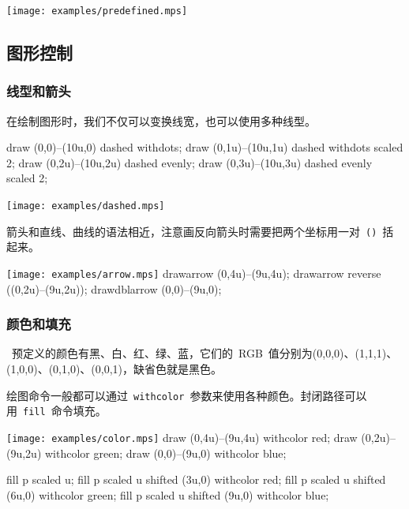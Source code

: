 \begin{out}
\texttt{[image: examples/predefined.mps]}
\end{out}

\subsection{图形控制}

\subsubsection{线型和箭头}
在绘制图形时，我们不仅可以变换线宽，也可以使用多种线型。
\begin{code}
draw (0,0)--(10u,0) dashed withdots;
draw (0,1u)--(10u,1u) dashed withdots scaled 2;
draw (0,2u)--(10u,2u) dashed evenly;
draw (0,3u)--(10u,3u) dashed evenly scaled 2;
\end{code}

\begin{out}
\texttt{[image: examples/dashed.mps]}
\end{out}

箭头和直线、曲线的语法相近，注意画反向箭头时需要把两个坐标用一对~\verb|()|~括起来。

\begin{fdemo}{\texttt{[image: examples/arrow.mps]}}
drawarrow (0,4u)--(9u,4u);
drawarrow reverse ((0,2u)--(9u,2u));
drawdblarrow (0,0)--(9u,0);
\end{fdemo}

\subsubsection{颜色和填充}
\MP~预定义的颜色有黑、白、红、绿、蓝，它们的~RGB~值分别为(0,0,0)、(1,1,1)、(1,0,0)、(0,1,0)、(0,0,1)，缺省色就是黑色。

绘图命令一般都可以通过~\verb|withcolor|~参数来使用各种颜色。封闭路径可以用~\verb|fill|~命令填充。

\begin{fdemo}{\texttt{[image: examples/color.mps]}}
draw (0,4u)--(9u,4u) withcolor red;
draw (0,2u)--(9u,2u) withcolor green;
draw (0,0)--(9u,0) withcolor blue;
\end{fdemo}

\begin{code}
fill p scaled u;
fill p scaled u shifted (3u,0) withcolor red;
fill p scaled u shifted (6u,0) withcolor green;
fill p scaled u shifted (9u,0) withcolor blue;
\end{code}


